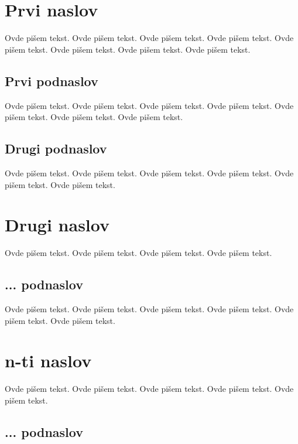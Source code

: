 \section{Prvi naslov}
\label{sec:naslov1}


Ovde pišem tekst.
Ovde pišem tekst.
Ovde pišem tekst.
Ovde pišem tekst.
Ovde pišem tekst.
Ovde pišem tekst.
Ovde pišem tekst.
Ovde pišem tekst.


\subsection{Prvi podnaslov}
\label{subsec:podnaslov1}

Ovde pišem tekst.
Ovde pišem tekst.
Ovde pišem tekst.
Ovde pišem tekst.
Ovde pišem tekst.
Ovde pišem tekst.
Ovde pišem tekst.

\subsection{Drugi podnaslov}
\label{subsec:podnaslov2}

Ovde pišem tekst.
Ovde pišem tekst.
Ovde pišem tekst.
Ovde pišem tekst.
Ovde pišem tekst.
Ovde pišem tekst.

\section{Drugi naslov}
\label{sec:naslov2}

Ovde pišem tekst.
Ovde pišem tekst.
Ovde pišem tekst.
Ovde pišem tekst.

\subsection{... podnaslov}
\label{subsec:podnaslovN}

Ovde pišem tekst.
Ovde pišem tekst.
Ovde pišem tekst.
Ovde pišem tekst.
Ovde pišem tekst.
Ovde pišem tekst.

\section{n-ti naslov}
\label{sec:naslovN}

Ovde pišem tekst.
Ovde pišem tekst.
Ovde pišem tekst.
Ovde pišem tekst.
Ovde pišem tekst.

\subsection{... podnaslov}
\label{subsec:podnaslovK}

